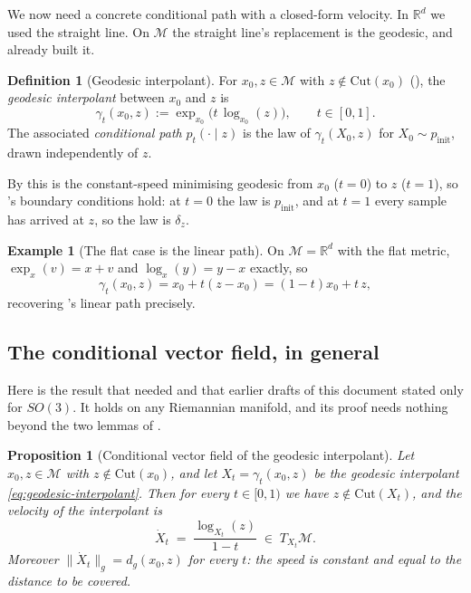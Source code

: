 \documentclass[11pt,a4paper]{report}
\newtheorem{proposition}[proposition]{Proposition}
\theoremstyle{definition}
\newtheorem{definition}[definition]{Definition}
\newtheorem{example}[example]{Example}
\theoremstyle{remark}
\newcommand{\RR}{\mathbb R}
\begin{document}
We now need a concrete conditional path with a closed-form velocity. In
$\RR^d$ we used the straight line. On $\mathcal M$ the straight line's
replacement is the geodesic, and  already
built it.

\begin{definition}[Geodesic interpolant]
\label{def:geodesic-interpolant}
For $x_0,z\in\mathcal M$ with $z\notin\mathrm{Cut}(x_0)$
(), the \emph{geodesic interpolant} between $x_0$ and
$z$ is
\begin{equation}
\label{eq:geodesic-interpolant}
\gamma_t(x_0,z) := \exp_{x_0}\bigl(t\,\log_{x_0}(z)\bigr) ,
\qquad t\in[0,1] .
\end{equation}
The associated \emph{conditional path} $p_t(\cdot\mid z)$ is the law of
$\gamma_t(X_0,z)$ for $X_0\sim p_{\mathrm{init}}$, drawn independently of
$z$.
\end{definition}

By  this is the constant-speed minimising
geodesic from $x_0$ ($t=0$) to $z$ ($t=1$), so 's
boundary conditions hold: at $t=0$ the law is $p_{\mathrm{init}}$, and at
$t=1$ every sample has arrived at $z$, so the law is $\delta_z$.

\begin{example}[The flat case is the linear path]
\label{ex:geodesic-flat-case}
On $\mathcal M=\RR^d$ with the flat metric, $\exp_x(v)=x+v$ and
$\log_x(y)=y-x$ exactly, so
\[
\gamma_t(x_0,z) = x_0 + t(z-x_0) = (1-t)x_0+t\,z ,
\]
recovering 's linear path precisely.
\end{example}

\subsection{The conditional vector field, in general}

Here is the result that  needed and that earlier
drafts of this document stated only for $SO(3)$. It holds on any Riemannian
manifold, and its proof needs nothing beyond the two lemmas of
.

\begin{proposition}[Conditional vector field of the geodesic interpolant]
\label{prop:geodesic-vf-general}
Let $x_0,z\in\mathcal M$ with $z\notin\mathrm{Cut}(x_0)$, and let
$X_t=\gamma_t(x_0,z)$ be the geodesic interpolant
\eqref{eq:geodesic-interpolant}. Then for every $t\in[0,1)$ we have
$z\notin\mathrm{Cut}(X_t)$, and the velocity of the interpolant is
\begin{equation}
\label{eq:geodesic-vf-general}
\dot X_t \;=\; \frac{\log_{X_t}(z)}{1-t} \;\in\; T_{X_t}\mathcal M .
\end{equation}
Moreover $\|\dot X_t\|_g=d_g(x_0,z)$ for every $t$: the speed is constant
and equal to the distance to be covered.
\end{proposition}
\end{document}
